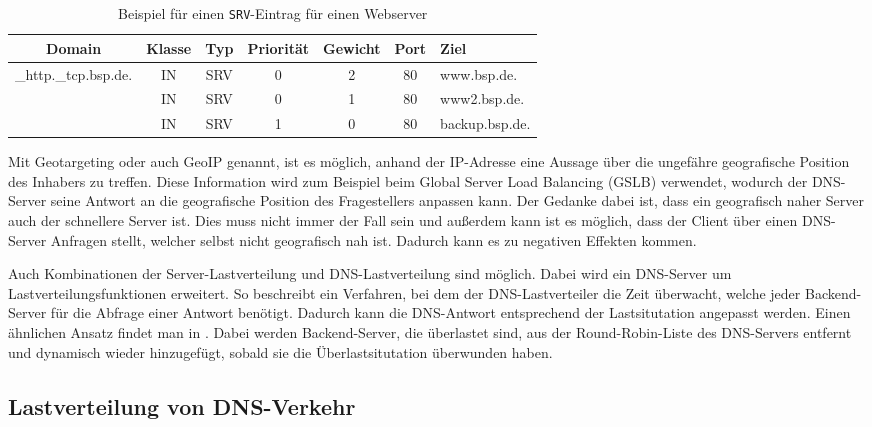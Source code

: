 \documentclass[a4paper, 12pt, BCOR10mm, DIV12, toc=bibliography, toc=listof, german]{scrbook}
\begin{document}
			\begin{table}
				\centering
				\begin{tabular}{|ccccccl|}\hline
				 Domain & Klasse & Typ & Priorität & Gewicht & Port & Ziel \\\hline\hline
					\_http.\_tcp.bsp.de. & IN & SRV & 0 & 2 & 80 & www.bsp.de. \\	
					& IN & SRV & 0 & 1 & 80 & www2.bsp.de. \\	
					& IN & SRV & 1 & 0 & 80 & backup.bsp.de. \\\hline
				\end{tabular}
				\caption{Beispiel für einen \texttt{SRV}-Eintrag für einen Webserver}
				\label{tab:srv}
			\end{table}
			
			Mit Geotargeting oder auch GeoIP genannt, ist es möglich, anhand der IP-Adresse eine Aussage
			über die ungefähre geografische Position des Inhabers zu treffen. Diese Information wird zum
			Beispiel beim Global Server Load Balancing (GSLB) \cite{bourke2001} verwendet, wodurch der
			DNS-Server seine Antwort an die geografische Position des Fragestellers anpassen kann. Der
			Gedanke dabei ist, dass ein geografisch naher Server auch der schnellere Server ist. Dies muss
			nicht immer der Fall sein und außerdem kann ist es möglich, dass der Client über einen DNS-Server
			Anfragen stellt, welcher selbst nicht geografisch nah ist. Dadurch kann es zu negativen
			Effekten kommen.

			Auch Kombinationen der Server-Lastverteilung und DNS-Lastverteilung sind möglich. Dabei wird ein
			DNS-Server um Lastverteilungsfunktionen erweitert. So beschreibt \cite{chyuyi2003} ein
			Verfahren, bei dem der DNS-Lastverteiler die Zeit überwacht, welche jeder Backend-Server für
			die Abfrage einer Antwort benötigt. Dadurch kann die DNS-Antwort entsprechend der
			Lastsitutation angepasst werden. Einen ähnlichen Ansatz findet man in \cite{mookim2005}. Dabei
			werden Backend-Server, die überlastet sind, aus der Round-Robin-Liste des DNS-Servers entfernt
			und dynamisch wieder hinzugefügt, sobald sie die Überlastsitutation überwunden haben.

			
			\subsection{Lastverteilung von DNS-Verkehr} %
			\label{sub:lastverteilung-dns}
\end{document}
